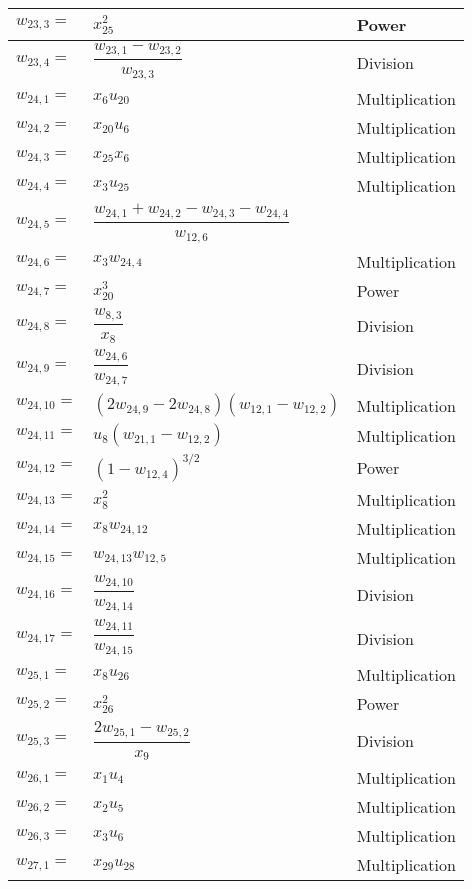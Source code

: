 \begin{longtable}{|p{1.5cm}|l|p{2cm}|}
$w_{23,3}=$ & $ x_{25}^{2} $ & Power  \\ \hline
$w_{23,4}=$ & $ \dfrac{w_{23,1}-w_{23,2}}{w_{23,3}} $ & Division \\ \hline
$w_{24,1}=$ & $ x_{6}u_{20} $ & Multiplication \\ \hline
$w_{24,2}=$ & $ x_{20}u_{6} $ & Multiplication \\ \hline
$w_{24,3}=$ & $ x_{25}x_{6} $ & Multiplication \\ \hline
$w_{24,4}=$ & $ x_{3}u_{25} $ & Multiplication \\ \hline
$w_{24,5}=$ & $ \dfrac{w_{24,1}+w_{24,2}-w_{24,3}-w_{24,4}}{w_{12,6}} $ &  \\ \hline
$w_{24,6}=$ & $ x_{3}w_{24,4} $ & Multiplication \\ \hline
$w_{24,7}=$ & $ x_{20}^{3} $ & Power \\ \hline
$w_{24,8}=$ & $ \dfrac{w_{8,3}}{x_{8}} $ & Division \\ \hline
$w_{24,9}=$ & $ \dfrac{w_{24,6}}{w_{24,7}} $ & Division \\ \hline
$w_{24,10}=$ & $ \left(2w_{24,9}-2w_{24,8}\right)\left(w_{12,1}-w_{12,2}\right) $ & Multiplication \\ \hline
$w_{24,11}=$ & $ u_{8}\left(w_{21,1}-w_{12,2}\right) $ & Multiplication \\ \hline
$w_{24,12}=$ & $ \left(1-w_{12,4}\right)^{3/2} $ & Power \\ \hline
$w_{24,13}=$ & $ x_{8}^{2} $ & Multiplication \\ \hline
$w_{24,14}=$ & $ x_{8}w_{24,12} $ & Multiplication \\ \hline
$w_{24,15}=$ & $ w_{24,13}w_{12,5} $ & Multiplication \\ \hline
$w_{24,16}=$ & $ \dfrac{w_{24,10}}{w_{24,14}} $ & Division \\ \hline
$w_{24,17}=$ & $ \dfrac{w_{24,11}}{w_{24,15}} $ & Division \\ \hline
$w_{25,1}=$ & $ x_{8}u_{26} $ & Multiplication \\ \hline
$w_{25,2}=$ & $ x_{26}^{2} $ & Power \\ \hline
$w_{25,3}=$ & $ \dfrac{2w_{25,1}-w_{25,2}}{x_{9}} $ & Division  \\ \hline
$w_{26,1}=$ & $ x_{1}u_{4} $ & Multiplication \\ \hline
$w_{26,2}=$ & $ x_{2}u_{5} $ & Multiplication \\ \hline
$w_{26,3}=$ & $ x_{3}u_{6} $ & Multiplication \\ \hline
$w_{27,1}=$ & $ x_{29}u_{28} $ & Multiplication \\ \hline

\end{longtable}
